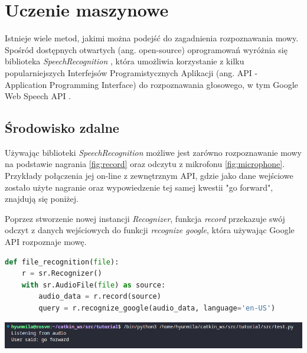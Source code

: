 \chapter{Uczenie maszynowe}
\label{cha:uczenieMaszynowe}

Istnieje wiele metod, jakimi można podejść do zagadnienia rozpoznawania mowy. Spośród dostępnych otwartych (ang. open-source) oprogramowań wyróżnia się biblioteka \textit{SpeechRecognition} \cite{speechrec}, która umożliwia korzystanie z kilku popularniejszych Interfejsów Programistycznych Aplikacji (ang. API - Application Programming Interface) do rozpoznawania głosowego, w tym Google Web Speech API \cite{webspeech}. 


\section{Środowisko zdalne}
\label{sec:srodZdal}

Używając biblioteki \textit{SpeechRecognition} możliwe jest zarówno rozpoznawanie mowy na podstawie nagrania \ref{fig:record} oraz odczytu z mikrofonu \ref{fig:microphone}. Przykłady połączenia jej on-line z zewnętrznym API, gdzie jako dane wejściowe zostało użyte nagranie oraz wypowiedzenie tej samej kwestii "go forward", znajdują się poniżej.

Poprzez stworzenie nowej instancji \textit{Recognizer}, funkcja \textit{record} przekazuje swój odczyt z danych wejściowych do funkcji \textit{recognize google}, która używając Google API \cite{webspeech} rozpoznaje mowę.

\begin{lstlisting}[language=Python]
def file_recognition(file):
    r = sr.Recognizer()
    with sr.AudioFile(file) as source:
        audio_data = r.record(source)
        query = r.recognize_google(audio_data, language='en-US')
\end{lstlisting}

\begin{center}
    \includegraphics[width=0.95\linewidth]{files/record.png}
    \label{fig:record}
\end{center}

